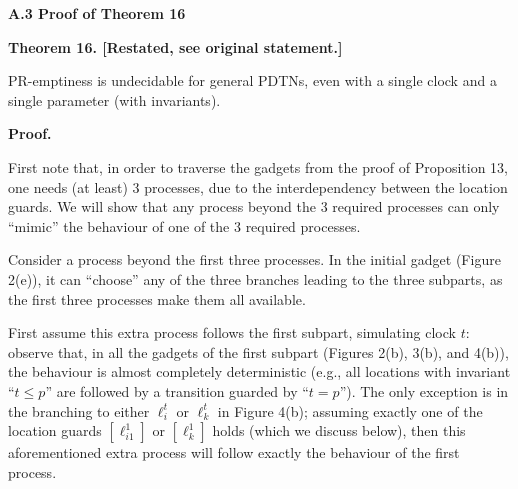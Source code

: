 \documentclass[10pt,a4paper]{article}
\begin{document}
 
\par\medskip\noindent\textbf{A.3 Proof of Theorem 16}\par
 
 
 
\par\medskip\noindent\textbf{Theorem 16. [Restated, see original statement.]}\par
 
 
PR-emptiness is undecidable for general PDTNs, even with a single clock and a single parameter (with invariants).\par
 
 
 
 
 
\par\medskip\noindent\textbf{Proof.}\par
 
 
First note that, in order to traverse the gadgets from the proof of Proposition 13, one needs (at least) 3 processes, due to the interdependency between the location guards. We will show that any process beyond the 3 required processes can only “mimic” the behaviour of one of the 3 required processes.\par
 
 
 
Consider a process beyond the first three processes. In the initial gadget (Figure 2(e)), it can “choose” any of the three branches leading to the three subparts, as the first three processes make them all available.\par
 
 
 
First assume this extra process follows the first subpart, simulating clock $t$: observe that, in all the gadgets of the first subpart (Figures 2(b), 3(b), and 4(b)), the behaviour is almost completely deterministic (e.g., all locations with invariant “$t\leq p$” are followed by a transition guarded by “$t=p$”). The only exception is in the branching to either $\mathrm{\mathrm{\ell}}_{i}^{t}$ or $\mathrm{\mathrm{\ell}}_{k}^{t}$ in Figure 4(b); assuming exactly one of the location guards $[\mathrm{\mathrm{\ell}}_{i1}^{1}]$ or $[\mathrm{\mathrm{\ell}}_{k}^{1}]$ holds (which we discuss below), then this aforementioned extra process will follow exactly the behaviour of the first process.\par
 
\end{document}
